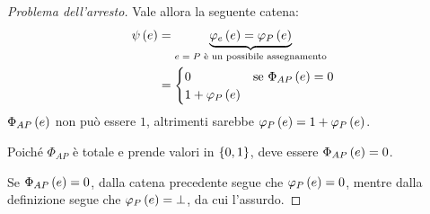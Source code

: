 \documentclass{lectures}
\begin{document}
\begin{multicols}{2}
\begin{proof}[Problema dell'arresto]
        Vale allora la seguente catena:
        \begin{align*}
            \psi\left(e\right) &= \underbrace{\varphi_e\left(e\right) = \varphi_P\left(e\right)}_{\text{\(e=P\) è un possibile assegnamento}}\\ &= \begin{cases}
                0 & \text{se }\Phi_{AP}\left(e\right) = 0\\
                1 + \varphi_P\left(e\right)
            \end{cases}
        \end{align*}
        \(\Phi_{AP}\left(e\right)\) non può essere \(1\), altrimenti sarebbe \(\varphi_P\left(e\right) = 1 + \varphi_P\left(e\right)\).
        
        Poiché \(\Phi_{AP}\) è totale e prende valori in \(\left\{0,1\right\}\), deve essere \(\Phi_{AP}\left(e\right) = 0\).
        
        Se \(\Phi_{AP}\left(e\right) = 0\), dalla catena precedente segue che \(\varphi_P\left(e\right) = 0\), mentre dalla definizione segue che \(\varphi_P\left(e\right) = \bot\), da cui l'assurdo.
    \end{proof}
\end{multicols}
\clearpage
\end{document}
